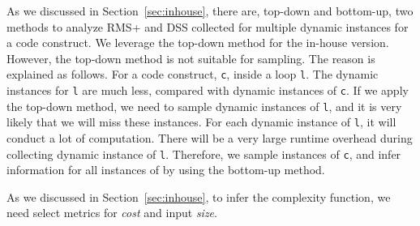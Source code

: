 As we discussed in Section~\ref{sec:inhouse},
there are, top-down and bottom-up, two methods to analyze RMS+ and DSS collected for multiple dynamic instances for a code construct. 
We leverage the top-down method for the in-house version. 
However, the top-down method is not suitable for sampling. 
The reason is explained as follows. 
For a code construct, \texttt{c}, inside a loop \texttt{l}.
The dynamic instances for \texttt{l} are much less, 
compared with dynamic instances of \texttt{c}.
If we apply the top-down method, 
we need to sample dynamic instances of \texttt{l}, 
and it is very likely that we will miss these instances. 
For each dynamic instance of \texttt{l}, it will conduct a lot of computation.
There will be a very large runtime overhead during collecting dynamic instance of \texttt{l}.
Therefore, we sample instances of \texttt{c}, and infer information for all instances of  by using the bottom-up method. 


As we discussed in Section~\ref{sec:inhouse}, 
to infer the complexity function, 
we need select metrics for \textit{cost} and input \textit{size}.

